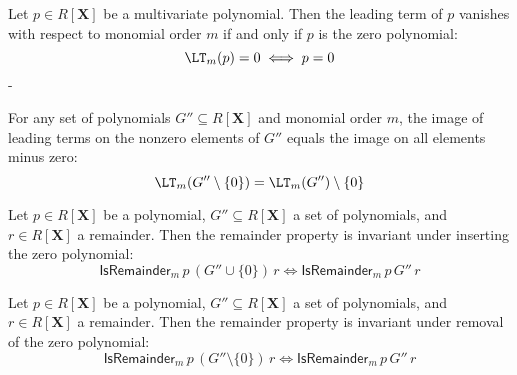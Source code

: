 \begin{lemma}\label{MonomialOrder.lm_eq_zero_iff}
  \leanok
  Let $p \in R[\mathbf{X}]$ be a multivariate polynomial. Then the leading term of $p$
vanishes with respect to monomial order $m$ if and only if $p$ is the zero polynomial:
\[
\LT_m(p) = 0 \iff p = 0
\]
-
\end{lemma}

\begin{lemma}\label{MonomialOrder.leadingTerm_image_sdiff_singleton_zero}
  \leanok
  For any set of polynomials $G'' \subseteq R[\mathbf{X}]$ and monomial order $m$,
the image of leading terms on the nonzero elements of $G''$ equals the image on all
elements minus zero:
\[
\LT_m(G'' \setminus \{0\}) = \LT_m(G'') \setminus \{0\}
\]

\end{lemma}

\begin{lemma}\label{MonomialOrder.isRemainder_of_insert_zero_iff_isRemainder}
  \leanok
  Let $p \in R[\mathbf{X}]$ be a polynomial, $G'' \subseteq R[\mathbf{X}]$ a set of polynomials,
and $r \in R[\mathbf{X}]$ a remainder. Then the remainder property is invariant under
inserting the zero polynomial:
\[
\mathsf{IsRemainder}_m\,p\,(G'' \cup \{0\})\,r \iff \mathsf{IsRemainder}_m\,p\,G''\,r
\]

\end{lemma}

\begin{lemma}\label{MonomialOrder.isRemainder_of_singleton_zero_iff_isRemainder}
  \leanok
  Let $p \in R[\mathbf{X}]$ be a polynomial, $G'' \subseteq R[\mathbf{X}]$ a set of polynomials,
and $r \in R[\mathbf{X}]$ a remainder. Then the remainder property is invariant under
removal of the zero polynomial:
\[
\mathsf{IsRemainder}_m\,p\,(G'' \setminus \{0\})\,r \iff \mathsf{IsRemainder}_m\,p\,G''\,r
\]

\end{lemma}


